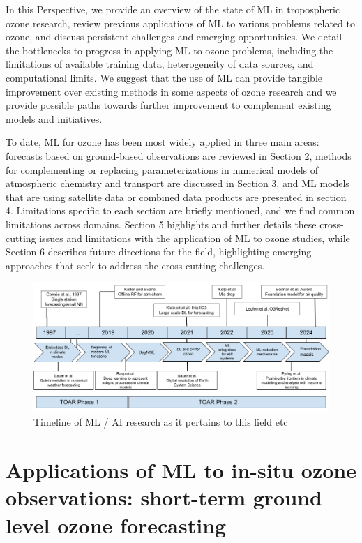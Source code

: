 \documentclass[gmd, manuscript]{copernicus}
\begin{document}
In this Perspective, we provide an overview of the state of ML in tropospheric ozone research, review previous applications of ML to various problems related to ozone, and discuss persistent challenges and emerging opportunities. We detail the bottlenecks to progress in applying ML to ozone problems, including the limitations of available training data, heterogeneity of data sources, and computational limits. We suggest that the use of ML can provide tangible improvement over existing methods in some aspects of ozone research and we provide possible paths towards further improvement to complement existing models and initiatives.

To date, ML for ozone has been most widely applied in three main areas: forecasts based on ground-based observations are reviewed in Section 2, methods for complementing or replacing parameterizations in numerical models of atmospheric chemistry and transport are discussed in Section 3, and ML models that are using satellite data or combined data products are presented in section 4. Limitations specific to each section are briefly mentioned, and we find common limitations across domains. Section 5 highlights and further details these cross-cutting issues and limitations with the application of ML to ozone studies, while Section 6 describes future directions for the field, highlighting emerging approaches that seek to address the cross-cutting challenges.


\begin{figure}
    \centering
    \includegraphics[width=0.95\linewidth]{figures/In progress ML4O3.png} 
    \caption{Timeline of ML / AI research as it pertains to this field etc}
    \label{fig:timeline}
\end{figure}


\section{Applications of ML to in-situ ozone observations: short-term ground level ozone forecasting}
\label{sec:tsforecast}
\end{document}
